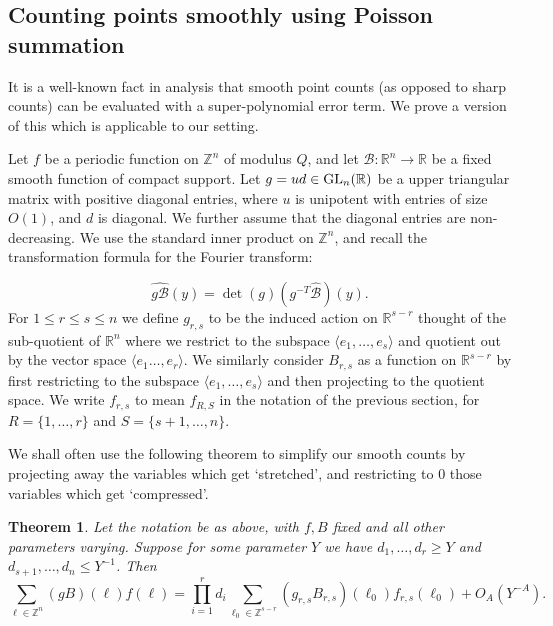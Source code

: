\documentclass{article}
\def\Z{{\mathbb Z}}
\def\GL{{\rm GL}}
\def\R{{\mathbb R}}
\def\cB{{\mathcal B}}
\def\Z{{\mathbb Z}}
\newtheorem{theorem}{Theorem}[section]
\begin{document}
\subsection{Counting points smoothly using Poisson summation}

It is a well-known fact in analysis that smooth point counts (as opposed to sharp counts) can be evaluated with a super-polynomial error term. We prove a version of this which is applicable to our setting.

Let $f$ be a periodic function on $\Z^n$ of modulus $Q$, and let $\cB:\R^n\to \R$ be a fixed smooth function of compact support. Let $g=ud\in \GL_n(\R)$ be a upper triangular matrix with positive diagonal entries, where $u$ is unipotent with entries of size $O(1)$, and $d$ is diagonal. We further assume that the diagonal entries are non-decreasing. We use the standard inner product on $\Z^n$, and recall the transformation formula for the Fourier transform:

$$\widehat{g\cB}(y) = \det(g) (g^{-T} \widehat{\cB})(y).$$
For $1\leq r\leq s\leq n$ we define $g_{r,s}$ to be the induced action on $\R^{s-r}$ thought of the sub-quotient of $\R^n$ where we restrict to the subspace $\langle e_1,\dots,e_{s}\rangle$ and quotient out by the vector space $\langle e_1\dots,e_r\rangle.$ We similarly consider $B_{r,s}$ as a function on $\R^{s-r}$ by first restricting to the subspace $\langle e_1,\dots,e_{s}\rangle$ and then projecting to the quotient space. We write $f_{r,s}$ to mean $f_{R,S}$ in the notation of the previous section, for $R=\{1,\dots,r\}$ and $S=\{s+1,\dots,n\}$. 

We shall often use the following theorem to simplify our smooth counts by projecting away the variables which get `stretched', and restricting to $0$ those variables which get `compressed'.

\begin{theorem}\label{thm:projectlargecoords}
    Let the notation be as above, with $f,B$ fixed and all other parameters varying. Suppose for some parameter $Y$ we have $d_1,\dots,d_r\geq Y$ and $d_{s+1},\dots,d_n\leq Y^{-1}$. Then
\begin{equation*}
\sum_{\ell\in \Z^n}(gB)(\ell)f(\ell) = \prod_{i=1}^r d_i  \sum_{\ell_0\in \Z^{s-r}}(g_{r,s}B_{r,s})(\ell_0)f_{r,s}(\ell_0) + O_A(Y^{-A}).
\end{equation*}
\end{theorem}
\end{document}

